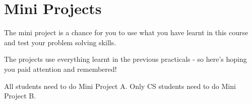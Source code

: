 \section{Mini Projects}
The mini project is a chance for you to use what you have learnt in this course and test your problem solving skills.

The projects use everything learnt in the previous practicals - so here's hoping you paid attention and remembered!

All students need to do Mini Project A. Only CS students need to do Mini Project B.






